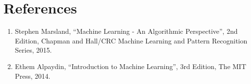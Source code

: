 \documentclass[12pt,a4paper]{article}
\begin{document}
\section{References}
\begin{enumerate}
\item Stephen Marsland, ``Machine Learning - An Algorithmic Perspective'', 2nd Edition, Chapman and
Hall/CRC Machine Learning and Pattern Recognition Series, 2015.
\item Ethem Alpaydin, ``Introduction to Machine Learning'', 3rd Edition, The MIT Press, 2014.
\end{enumerate}
\end{document}
